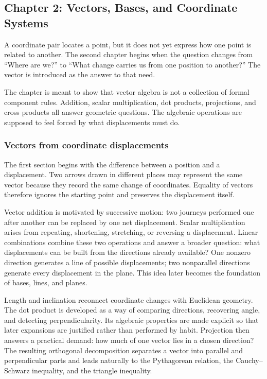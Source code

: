 \subsection*{Chapter 2: Vectors, Bases, and Coordinate Systems}

A coordinate pair locates a point, but it does not yet express how one point is
related to another. The second chapter begins when the question changes from
``Where are we?'' to ``What change carries us from one position to another?'' The
vector is introduced as the answer to that need.

The chapter is meant to show that vector algebra is not a collection of formal
component rules. Addition, scalar multiplication, dot products, projections, and
cross products all answer geometric questions. The algebraic operations are
supposed to feel forced by what displacements must do.

\subsubsection*{Vectors from coordinate displacements}

The first section begins with the difference between a position and a displacement.
Two arrows drawn in different places may represent the same vector because they
record the same change of coordinates. Equality of vectors therefore ignores the
starting point and preserves the displacement itself.

Vector addition is motivated by successive motion: two journeys performed one
after another can be replaced by one net displacement. Scalar multiplication
arises from repeating, shortening, stretching, or reversing a displacement.
Linear combinations combine these two operations and answer a broader question:
what displacements can be built from the directions already available? One
nonzero direction generates a line of possible displacements; two nonparallel
directions generate every displacement in the plane. This idea later becomes the
foundation of bases, lines, and planes.

Length and inclination reconnect coordinate changes with Euclidean geometry. The
dot product is developed as a way of comparing directions, recovering angle, and
detecting perpendicularity. Its algebraic properties are made explicit so that
later expansions are justified rather than performed by habit. Projection then
answers a practical demand: how much of one vector lies in a chosen direction?
The resulting orthogonal decomposition separates a vector into parallel and
perpendicular parts and leads naturally to the Pythagorean relation, the
Cauchy--Schwarz inequality, and the triangle inequality.

